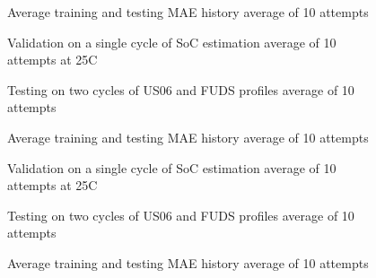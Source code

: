 \begin{figure*}[htbp]
    \centering
    \begin{subfigure}[b]{0.325\textwidth}
        \centering
        
        \caption{Average training and testing MAE history average of 10 attempts}
    \end{subfigure}
    \hfill
    \begin{subfigure}[b]{0.325\textwidth}
        \centering
        
        \caption{Validation on a single cycle of SoC estimation average of 10 attempts at 25\textdegree{}C}
    \end{subfigure}
    \hfill
    \begin{subfigure}[b]{0.325\textwidth}
        \centering
        
        \caption{Testing on two cycles of US06 and FUDS profiles average of 10 attempts}
        \label{subfig:Model-2res-DSTvsFUDS}
    \end{subfigure}
    \begin{subfigure}[b]{0.325\textwidth}
        \centering
        
        \caption{Average training and testing MAE history average of 10 attempts}
    \end{subfigure}
    \hfill
    \begin{subfigure}[b]{0.325\textwidth}
        \centering
        
        \caption{Validation on a single cycle of SoC estimation average of 10 attempts at 25\textdegree{}C}
    \end{subfigure}
    \hfill
    \begin{subfigure}[b]{0.325\textwidth}
        \centering
        
        \caption{Testing on two cycles of US06 and FUDS profiles average of 10 attempts}
    \end{subfigure}
    \begin{subfigure}[b]{0.325\textwidth}
        \centering
        
        \caption{Average training and testing MAE history average of 10 attempts}

\end{subfigure}
\end{figure*}
